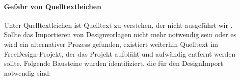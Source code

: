 \paragraph{Gefahr von Quelltextleichen}
Unter Quelltextleichen ist Quelltext zu verstehen, der nicht ausgeführt wir \autocite[vgl.][292]{Martin2009}. Sollte das Importieren von Designvorlagen nicht mehr notwendig sein oder es wird ein alternativer Prozess gefunden, existiert weiterhin Quelltext im FreeDesign-Projekt, der das Projekt aufbläht und aufwändig entfernt werden sollte.
\newline
Folgende Bausteine wurden identifiziert, die für den DesignImport notwendig sind: 

\begin{multicols}{2}    
    
\end{multicols}
